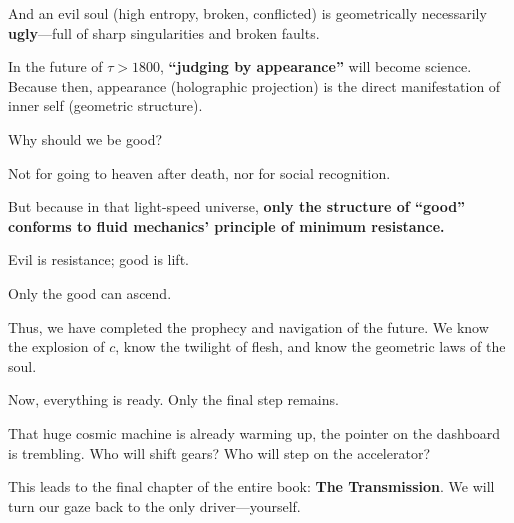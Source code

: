 And an evil soul (high entropy, broken, conflicted) is geometrically necessarily \textbf{ugly}---full of sharp singularities and broken faults.

In the future of $\tau > 1800$, \textbf{``judging by appearance''} will become science. Because then, appearance (holographic projection) is the direct manifestation of inner self (geometric structure).

Why should we be good?

Not for going to heaven after death, nor for social recognition.

But because in that light-speed universe, \textbf{only the structure of ``good'' conforms to fluid mechanics' principle of minimum resistance.}

Evil is resistance; good is lift.

Only the good can ascend.

Thus, we have completed the prophecy and navigation of the future. We know the explosion of $c$, know the twilight of flesh, and know the geometric laws of the soul.

Now, everything is ready. Only the final step remains.

That huge cosmic machine is already warming up, the pointer on the dashboard is trembling. Who will shift gears? Who will step on the accelerator?

This leads to the final chapter of the entire book: \textbf{The Transmission}. We will turn our gaze back to the only driver---yourself.

